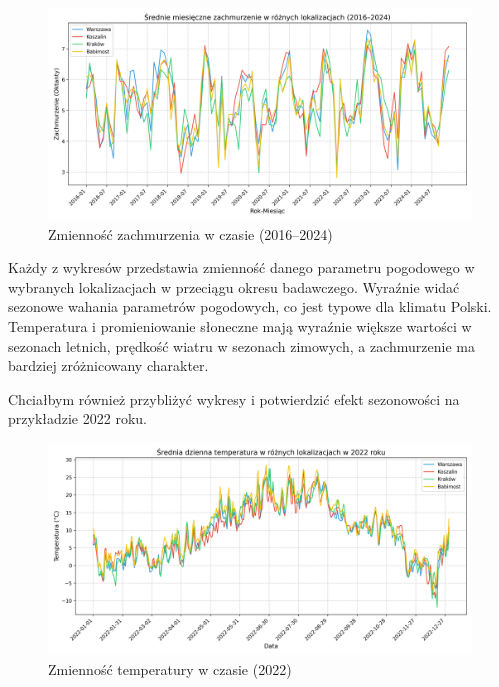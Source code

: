\begin{figure}[H]
    \centering
    \includegraphics[width=\textwidth]{../plots/data/cloud_cover_time_series_full.png}
    \caption{Zmienność zachmurzenia w czasie (2016–2024)}
    \label{fig:cloud-cover-time-series-full}
\end{figure}

Każdy z wykresów przedstawia zmienność danego parametru pogodowego w wybranych lokalizacjach w przeciągu okresu badawczego. Wyraźnie widać sezonowe wahania parametrów pogodowych, co jest typowe dla klimatu Polski. Temperatura i promieniowanie słoneczne mają wyraźnie większe wartości w sezonach letnich, prędkość wiatru w sezonach zimowych, a zachmurzenie ma bardziej zróżnicowany charakter.

Chciałbym również przybliżyć wykresy i potwierdzić efekt sezonowości na przykładzie 2022 roku. 

\begin{figure}[H]
    \centering
    \includegraphics[width=\textwidth]{../plots/data/temp_time_series_2022.png}
    \caption{Zmienność temperatury w czasie (2022)}
    \label{fig:temp-time-series-2022}
\end{figure}

